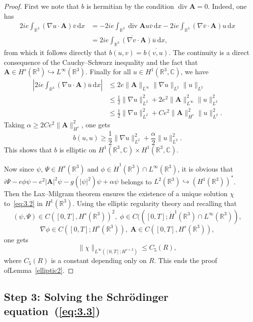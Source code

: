 \documentclass[10pt]{amsart}
\theoremstyle{definition}\newtheorem{defi}[theo]{Definition}\newtheorem{rema}[theo]{Remark}\newtheorem{exam}[theo]{Example}\newtheorem{exem}[theo]{Example}\newtheorem{nota}[theo]{Notation}
\newcommand{\BA}{\mathbf{A}}
\newcommand{\R}{\mathbb{R}}
\newcommand{\Com}{\mathbb{C}}
\DeclareMathOperator{\Div}{div}
\newcommand*{\dd}{\mathrm{d}}
\newcommand*{\dx}{\dd x}
\begin{document}
\begin{proof}
First we note that $b$ is hermitian by the condition $\Div \BA=0$. Indeed, one has
\begin{align*}
2ie \int_{\R^3} (\nabla u\cdot \BA) \overline{v} \,\dx &= -2ie \int_{\R^3} \Div \BA u\overline{v} \,\dx -2ie \int_{\R^3} (\nabla \overline{v} \cdot \BA) u \,\dx \\
&= \overline{2ie \int_{\R^3}(\nabla {v}\cdot \BA)\overline{u} \,\dx},
\end{align*}
from which it follows directly that $b(u,v)=\overline{b(v,u)}$. The continuity is a direct consequence of the Cauchy--Schwarz inequality and the fact that $\BA\in H^s(\R^3) \hookrightarrow L^\infty(\R^3)$. Finally for all $u\in H^1(\R^3,\Com)$, we have
\begin{align*}
\left | 2ie\int_{\R^3} (\nabla u\cdot \BA) \overline{u} \,\dx\right| &\leq 2e \| \BA \|_{L^\infty} \| \nabla u \|_{L^2} \| u \|_{L^2} \\
&\leq \frac{1}{2} \| \nabla u \|_{L^2}^2 +2e^2 \| \BA \|_{L^\infty}^2 \| u \|_{L^2}^2\\
&\leq \frac{1}{2} \| \nabla u \|_{L^2}^2 +Ce^2 \| \BA \|_{H^s}^2 \| u \|_{L^2}^2.
\end{align*}
Taking $\alpha \ge 2Ce^2 \| \BA \|_{H^s}^2$, one gets
\[
b(u,u) \geq \frac{1}{2} \| \nabla u \|_{L^2}^2 + \frac{\alpha}{2} \| u \|_{L^2}^2.
\]
This shows that $b$ is elliptic on $H^1(\R^3,\Com)\times H^1(\R^3,\Com)$.

Now since $\psi$, $\Psi\in H^s(\R^3)$ and $\phi\in \dot{H}^1(\R^3)\cap L^\infty(\R^3)$, it is obvious that $ i\Psi-e\phi \psi -e^2 |\BA|^2 \psi -g(|\psi|^2)\psi+\alpha \psi$ belongs to $L^2(\R^3)\hookrightarrow (H^1(\R^3))^*$. Then the Lax--Milgram theorem ensures the existence of a unique solution $\chi$ to~\eqref{eq:3.2} in $H^1(\R^3)$. Using the elliptic regularity theory and recalling that
\[
(\psi,\Psi) \in C([0,T],H^s(\R^3))^2,
\; \phi \in C(([0,T];\dot{H}^1(\R^3)\cap L^\infty(\R^3)),
\]
\[
\nabla \phi \in C([0,T];H^s(\R^3)),\; \BA \in C([0,T],H^s(\R^3)),
\]
one gets
\[
\| \chi \|_{L^\infty([0,T];H^{s+2})}\leq C_5(R),
\]
where $C_5(R)$ is a constant depending only on $R$. This ends the proof of\linebreak Lemma~\ref{elliptic2}.
\end{proof}

\subsection*{Step 3: Solving the Schr\"odinger equation~(\ref{eq:3.3})}
\end{document}
